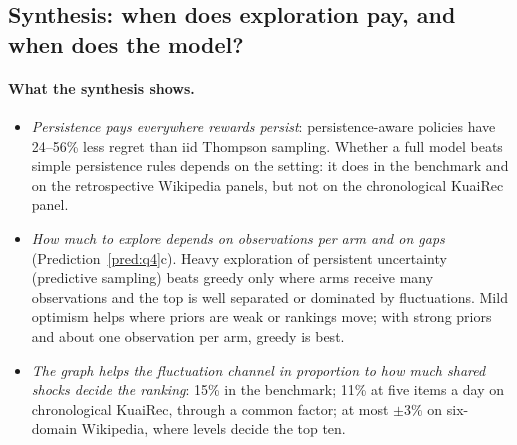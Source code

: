 \documentclass[11pt]{article}
\theoremstyle{definition}
\theoremstyle{remark}
\begin{document}
\subsection{Synthesis: when does exploration pay, and when does the model?}

\begin{table}[t]\centering\small
{}
\caption{When exploration pays. Ratios below 1 favour the exploring policy over greedy use of the same model. $^*$Retrospective panels. $^\ddagger$UCB with the development-tuned bonus (0.5 sd).}\label{tab:synth}
\end{table}

\paragraph{What the synthesis shows.}
\begin{itemize}
\item \emph{Persistence pays everywhere rewards persist}: persistence-aware policies have 24--56\% less regret than iid Thompson sampling. Whether a full model beats simple persistence rules depends on the setting: it does in the benchmark and on the retrospective Wikipedia panels, but not on the chronological KuaiRec panel.
\item \emph{How much to explore depends on observations per arm and on gaps} (Prediction~\ref{pred:q4}c). Heavy exploration of persistent uncertainty (predictive sampling) beats greedy only where arms receive many observations and the top is well separated or dominated by fluctuations. Mild optimism helps where priors are weak or rankings move; with strong priors and about one observation per arm, greedy is best.
\item \emph{The graph helps the fluctuation channel in proportion to how much shared shocks decide the ranking}: 15\% in the benchmark; 11\% at five items a day on chronological KuaiRec, through a common factor; at most $\pm3\%$ on six-domain Wikipedia, where levels decide the top ten.
\end{itemize}
\end{document}
